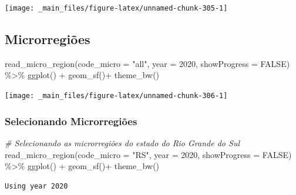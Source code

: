 \documentclass[
  brazilian,
]{book}
\newenvironment{Shaded}{\begin{snugshade}}{\end{snugshade}}
\newcommand{\AttributeTok}[1]{\textcolor[rgb]{0.77,0.63,0.00}{#1}}
\newcommand{\CommentTok}[1]{\textcolor[rgb]{0.56,0.35,0.01}{\textit{#1}}}
\newcommand{\ConstantTok}[1]{\textcolor[rgb]{0.00,0.00,0.00}{#1}}
\newcommand{\DecValTok}[1]{\textcolor[rgb]{0.00,0.00,0.81}{#1}}
\newcommand{\FunctionTok}[1]{\textcolor[rgb]{0.00,0.00,0.00}{#1}}
\newcommand{\NormalTok}[1]{#1}
\newcommand{\SpecialCharTok}[1]{\textcolor[rgb]{0.00,0.00,0.00}{#1}}
\newcommand{\StringTok}[1]{\textcolor[rgb]{0.31,0.60,0.02}{#1}}
\begin{document}
\begin{center}\texttt{[image: \_main\_files/figure-latex/unnamed-chunk-305-1]} \end{center}

\hypertarget{microrregiuxf5es}{%
\subsection{Microrregiões}\label{microrregiuxf5es}}

\begin{Shaded}
\begin{Highlighting}[]
\FunctionTok{read\_micro\_region}\NormalTok{(}\AttributeTok{code\_micro =} \StringTok{"all"}\NormalTok{,}
                  \AttributeTok{year =} \DecValTok{2020}\NormalTok{,}
                  \AttributeTok{showProgress =} \ConstantTok{FALSE}\NormalTok{) }\SpecialCharTok{\%\textgreater{}\%} 
  \FunctionTok{ggplot}\NormalTok{() }\SpecialCharTok{+}
  \FunctionTok{geom\_sf}\NormalTok{()}\SpecialCharTok{+}
  \FunctionTok{theme\_bw}\NormalTok{()}
\end{Highlighting}
\end{Shaded}

\begin{center}\texttt{[image: \_main\_files/figure-latex/unnamed-chunk-306-1]} \end{center}

\hypertarget{selecionando-microrregiuxf5es}{%
\subsubsection{Selecionando Microrregiões}\label{selecionando-microrregiuxf5es}}

\begin{Shaded}
\begin{Highlighting}[]
\CommentTok{\# Selecionando as microrregiões do estado do Rio Grande do Sul}
\FunctionTok{read\_micro\_region}\NormalTok{(}\AttributeTok{code\_micro =} \StringTok{"RS"}\NormalTok{,}
                  \AttributeTok{year =} \DecValTok{2020}\NormalTok{,}
                  \AttributeTok{showProgress =} \ConstantTok{FALSE}\NormalTok{) }\SpecialCharTok{\%\textgreater{}\%} 
  \FunctionTok{ggplot}\NormalTok{() }\SpecialCharTok{+}
  \FunctionTok{geom\_sf}\NormalTok{()}\SpecialCharTok{+}
  \FunctionTok{theme\_bw}\NormalTok{()}
\end{Highlighting}
\end{Shaded}

\begin{verbatim}
Using year 2020
\end{verbatim}
\end{document}
